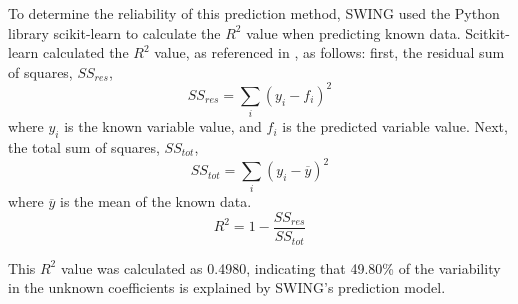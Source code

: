 \documentclass[journal,twoside,web]{ieeecolor}
\begin{document}
To determine the reliability of this prediction method, SWING used the Python library scikit-learn\cite{b7} 
to calculate the $R^2$ value when predicting known data. Scitkit-learn calculated the $R^2$ value, as referenced in \cite{b7}, as follows:
first, the residual sum of squares, $SS_{res}$,
\begin{equation}
    \label{eq:ResidSumSquares}
    SS_{res} = \sum_{i}{(y_i-f_i)^2}
\end{equation}
where $y_i$ is the known variable value, and $f_i$ is the predicted variable value.
Next, the total sum of squares, $SS_{tot}$,
\begin{equation}
    \label{eq:TotSumSquares}
    SS_{tot} = \sum_{i}{(y_i-\overline{y})^2}
\end{equation}
where $\overline{y}$ is the mean of the known data.
\begin{equation}
    \label{eq:CoeffDeterm}
    R^2 = 1 - \frac{SS_{res}}{SS_{tot}}
\end{equation}

This $R^2$ value was calculated as 0.4980, indicating that 49.80\% of the variability in the unknown coefficients is 
explained by SWING's prediction model.
\end{document}
